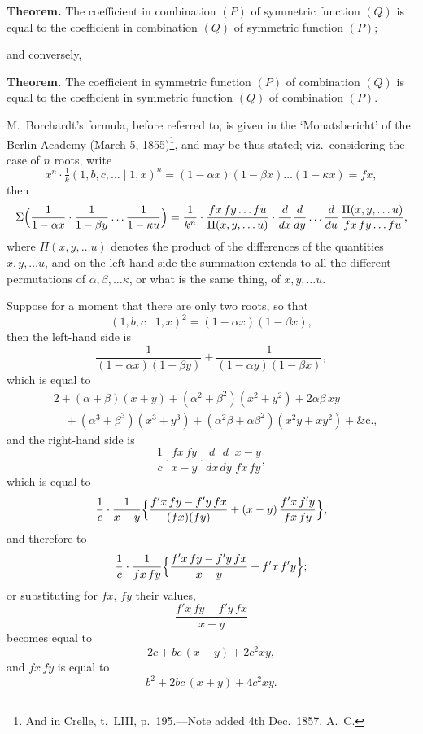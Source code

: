 \documentclass[11pt]{article}
\begin{document}
\medskip

\noindent\textbf{Theorem.} The coefficient in combination $(P)$ of symmetric function $(Q)$ is equal to the coefficient in combination $(Q)$ of symmetric function $(P)$;

\medskip

\noindent and conversely,

\medskip

\noindent\textbf{Theorem.} The coefficient in symmetric function $(P)$ of combination $(Q)$ is equal to the coefficient in symmetric function $(Q)$ of combination $(P)$.

\medskip

M.~Borchardt's formula, before referred to, is given in the `Monatsbericht' of the Berlin Academy (March 5, 1855)\footnote{And in Crelle, t.~LIII, p.~195.---Note added 4th Dec.\ 1857, A.~C.}, and may be thus stated; viz.\ considering the case of $n$ roots, write
\[
x^n \cdot \tfrac{1}{k}(1, b, c, \ldots \mid 1, x)^n = (1 - \alpha x)(1 - \beta x)\ldots(1 - \kappa x) = f x,
\]
then
\[
\resizebox{\textwidth}{!}{$\displaystyle \Sigma\Bigl(\frac{1}{1 - \alpha x}\cdot\frac{1}{1 - \beta y}\ldots\frac{1}{1 - \kappa u}\Bigr) = \frac{1}{k^n}\cdot\frac{f x\, f y \ldots f u}{\Pi(x, y, \ldots u)}\cdot\frac{d}{dx}\frac{d}{dy}\ldots\frac{d}{du}\,\frac{\Pi(x, y, \ldots u)}{f x\, f y \ldots f u},$}
\]
where $\Pi(x, y, \ldots u)$ denotes the product of the differences of the quantities $x, y, \ldots u$, and on the left-hand side the summation extends to all the different permutations of $\alpha, \beta, \ldots\kappa$, or what is the same thing, of $x, y, \ldots u$.

\medskip

Suppose for a moment that there are only two roots, so that
\[
(1, b, c \mid 1, x)^2 = (1 - \alpha x)(1 - \beta x),
\]
then the left-hand side is
\[
\frac{1}{(1 - \alpha x)(1 - \beta y)} + \frac{1}{(1 - \alpha y)(1 - \beta x)},
\]
which is equal to
\begin{align*}
&2 + (\alpha + \beta)(x + y) + (\alpha^2 + \beta^2)(x^2 + y^2) + 2\alpha\beta\, x y \\
&\quad + (\alpha^3 + \beta^3)(x^3 + y^3) + (\alpha^2\beta + \alpha\beta^2)(x^2 y + x y^2) + \&\text{c.},
\end{align*}
and the right-hand side is
\[
\frac{1}{c}\cdot\frac{f x\, f y}{x - y}\cdot\frac{d}{dx}\frac{d}{dy}\,\frac{x - y}{f x\, f y},
\]
which is equal to
\[
\frac{1}{c}\cdot\frac{1}{x - y}\Bigl\{\frac{f'x\, f y - f'y\, f x}{(f x)(f y)} + (x - y)\,\frac{f'x\, f'y}{f x\, f y}\Bigr\},
\]
and therefore to
\[
\frac{1}{c}\cdot\frac{1}{f x\, f y}\Bigl\{\frac{f'x\, f y - f'y\, f x}{x - y} + f'x\, f'y\Bigr\};
\]
or substituting for $f x,\, f y$ their values,
\[
\frac{f'x\, f y - f'y\, f x}{x - y}
\]
becomes equal to
\[
2 c + b c\,(x + y) + 2 c^2 x y,
\]
and $f x\, f y$ is equal to
\[
b^2 + 2 b c\,(x + y) + 4 c^2 x y.
\]
\end{document}
